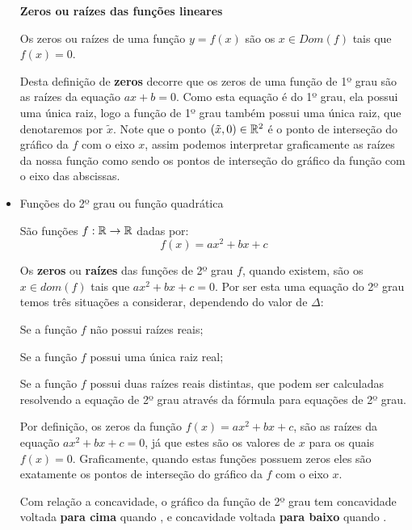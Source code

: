 \begin{itemize}
 \textbf{Zeros ou raízes das funções lineares}

 \vskip0.3cm
 \colorbox{azul}{
 \begin{minipage}{0.9\linewidth}
 \begin{center}
 Os zeros ou raízes de uma função $y= f(x)$ são os $x \in Dom(f)$ tais que $f(x)= 0$.
 \end{center}
 \end{minipage}}
 \vskip0.3cm

 Desta definição de \textbf{zeros} decorre que os zeros de uma função de 1º grau são as raízes da equação $ax+b=0$. Como esta equação é do 1º grau, ela possui uma única raiz, logo a função de 1º grau também possui uma única raiz, que denotaremos por $\tilde{x}$. Note que o ponto $(\tilde{x}, 0) \in \mathbb{R}^2$ é o ponto de interseção do gráfico da $f$ com o eixo $x$, assim podemos interpretar graficamente as raízes da nossa função como sendo os pontos de interseção do gráfico da função com o eixo das abscissas.

 \item Funções do 2º grau ou função quadrática

 São funções $f: \mathbb{R} \rightarrow \mathbb{R}$ dadas por:
 \[f(x)= ax^2 + bx + c\]

 Os \textbf{zeros} ou \textbf{raízes} das funções de 2º grau $f$, quando existem, são os $x \in dom(f)$ tais que $ax^2+bx+c=0$. Por ser esta uma equação do 2º grau temos três situações a considerar, dependendo do valor de $\Delta$:
 

 Se  a função $f$ não possui raízes reais;

 Se  a função $f$ possui uma única raiz real;

 Se  a função $f$ possui duas raízes reais distintas, que podem ser calculadas resolvendo a equação de 2º grau através da fórmula para equações de 2º grau.

 Por definição, os zeros da função $f(x)= ax^2+bx+c$, são as raízes da equação $ax^2+bx+c=0$, já que estes são os valores de $x$ para os quais $f(x)=0$. Graficamente, quando estas funções possuem zeros eles são exatamente os pontos de interseção do gráfico da $f$ com o eixo $x$.

 Com relação a concavidade, o gráfico da função de 2º grau tem concavidade voltada \textbf{para cima} quando , e concavidade voltada \textbf{para baixo} quando .


\end{itemize}
